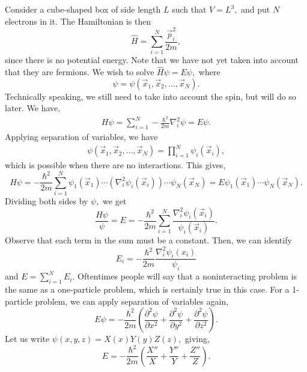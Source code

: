 \documentclass{article}
\numberwithin{equation}{section}
\begin{document}
Consider a cube-shaped box of side length $L$ such that $V=L^3,$ and put $N$ electrons in it. The Hamiltonian is then 
\begin{equation}
    \hat{H} = \sum_{i=1}^N \frac{\vec{p}_i^2}{2m},
\end{equation}
since there is no potential energy. Note that we have not yet taken into account that they are fermions. We wish to solve $\hat{H}\psi = E\psi,$ where 
\begin{equation}
    \psi = \psi(\vec{x}_1,\vec{x}_2,\dots,\vec{x}_N).
\end{equation}
Technically speaking, we still need to take into account the spin, but will do so later. We have,
\begin{align}
    H\psi = \sum_{i=1}^N -\frac{\hbar^2}{2m}\nabla_i^2 \psi = E\psi.
\end{align}
Applying separation of variables, we have
\begin{align}
    \psi(\vec{x}_1,\vec{x}_2,\dots,\vec{x}_N) = \prod_{i=1}^N \psi_i(\vec{x}_i),
\end{align}
which is possible when there are no interactions. This gives,
\begin{equation}
    H\psi = -\frac{\hbar^2}{2m}\sum_{i=1}^{N}\psi_1(\vec{x}_1)\cdots (\nabla_i^2 \psi_i(\vec{x}_i)) \cdots \psi_N(\vec{x}_N) = E\psi_1(\vec{x}_1)\cdots \psi_N(\vec{x}_N).
\end{equation}
Dividing both sides by $\psi,$ we get 
\begin{equation}
    \frac{H\psi}{\psi} = E = -\frac{\hbar^2}{2m} \sum_{i=1}^N \frac{\nabla_i^2 \psi_i(\vec{x}_i)}{\psi_i(\vec{x}_i)}.
\end{equation}
Observe that each term in the sum must be a constant. Then, we can identify 
\begin{equation}
    E_i = -\frac{\hbar^2}{2m}\frac{\nabla_i^2\psi_i(x_i)}{\psi_i}
\end{equation}
and $E = \sum_{i=1}^N E_i.$ Oftentimes people will say that a noninteracting problem is the same as a one-particle problem, which is certainly true in this case. For a 1-particle problem, we can apply separation of variables again,
\begin{equation}
    E\psi = -\frac{\hbar^2}{2m} \left(\frac{\partial^2\psi}{\partial x^2} + \frac{\partial^2\psi}{\partial y^2} + \frac{\partial^2\psi}{\partial z^2}\right). 
\end{equation}
Let us write $\psi(x,y,z)=X(x)Y(y)Z(z),$ giving,
\begin{equation}
    E = -\frac{\hbar^2}{2m}\left( \frac{X''}{X} + \frac{Y''}{Y} + \frac{Z''}{Z}\right).
\end{equation}
\end{document}
